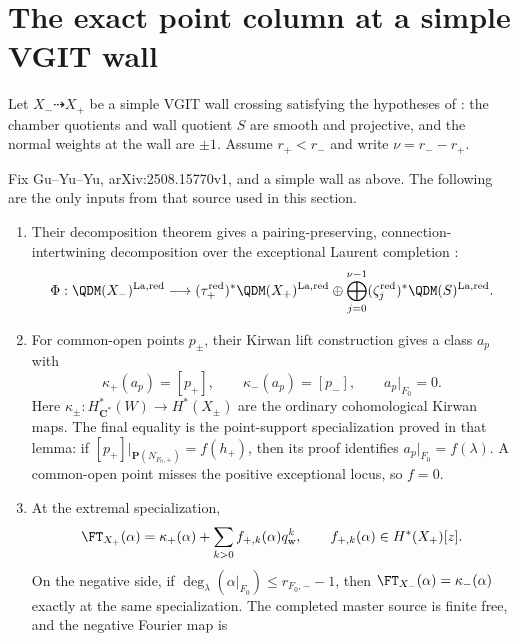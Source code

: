 \section{The exact point column at a simple VGIT wall}
\label{sec:simple-wall}

Let \(X_-\dashrightarrow X_+\) be a simple VGIT wall crossing satisfying the
hypotheses of \cite[Definition~3.2]{GuYuYu}: the chamber quotients and wall
quotient \(S\) are smooth and projective, and the normal weights at the wall
are \(\pm1\).  Assume \(r_+<r_-\) and write \(\nu=r_--r_+\).
\begin{proposition}
\label{prop:gyy-simple-wall-input}
Fix Gu--Yu--Yu, arXiv:2508.15770v1, and a simple wall as above. The following
are the only inputs from that source used in this section.
\begin{enumerate}[label=\textup{(G\arabic*)}]
\item Their decomposition theorem gives a pairing-preserving,
connection-intertwining decomposition over the exceptional Laurent completion
\cite[Theorem~6.2, p.~54]{GuYuYu}:
\begin{equation}\label{eq:simple-wall-qdm-decomposition}
 \Phi:\QDM(X_-)^{\mathrm{La,red}}
 \longrightarrow
 (\tau_+^{\mathrm{red}})^*\QDM(X_+)^{\mathrm{La,red}}
 \oplus\bigoplus_{j=0}^{\nu-1}
 (\zeta_j^{\mathrm{red}})^*\QDM(S)^{\mathrm{La,red}}.
\end{equation}
\item For common-open points \(p_\pm\), their Kirwan lift construction gives
a class \(a_p\) with \cite[Lemma~3.27, pp.~24--25]{GuYuYu}
\begin{equation}\label{eq:master-point-restrictions}
 \kappa_+(a_p)=[p_+],\qquad
 \kappa_-(a_p)=[p_-],\qquad
 a_p|_{F_0}=0.
\end{equation}
Here \(\kappa_\pm:H^*_{\mathbf C^*}(W)\to H^*(X_\pm)\) are the ordinary
cohomological Kirwan maps. The final equality is the point-support
specialization proved in that lemma: if
\([p_+]|_{\mathbf P(N_{F_0,+})}=f(h_+)\), then its proof identifies
\(a_p|_{F_0}=f(\lambda)\).  A common-open point misses the positive
exceptional locus, so \(f=0\).
\item At the extremal specialization,
\[
 \FT_{X_+}(\alpha)=\kappa_+(\alpha)
   +\sum_{k>0}f_{+,k}(\alpha)q_{\mathrm w}^k,
 \qquad f_{+,k}(\alpha)\in H^*(X_+)[z].
\]
On the negative side, if
\(\deg_\lambda(\alpha|_{F_0})\le r_{F_0,-}-1\), then
\(\FT_{X_-}(\alpha)=\kappa_-(\alpha)\) exactly at the same specialization.
The completed master source is finite free, and the negative Fourier map is

\end{enumerate}
\end{proposition}
